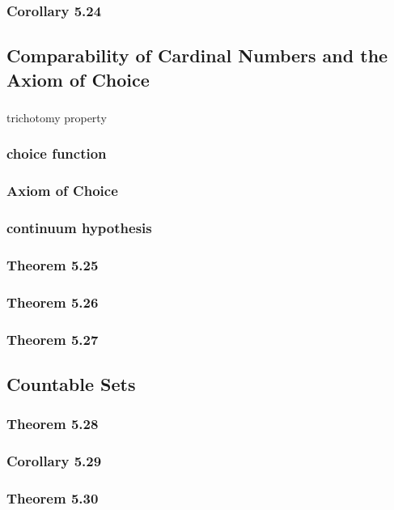 \documentclass[a4paper]{article}
\begin{document}
\subsubsection*{Corollary 5.24}

\newpage
\subsection{Comparability of Cardinal Numbers and the Axiom of Choice}   %
\subsubsection*{}trichotomy property
\subsubsection*{choice function}
\subsubsection*{Axiom of Choice}
\subsubsection*{continuum hypothesis}
\subsubsection*{Theorem 5.25}
\subsubsection*{Theorem 5.26}
\subsubsection*{Theorem 5.27}

\newpage
\subsection{Countable Sets}   %
\subsubsection*{Theorem 5.28}
\subsubsection*{Corollary 5.29}
\subsubsection*{Theorem 5.30}
\end{document}
